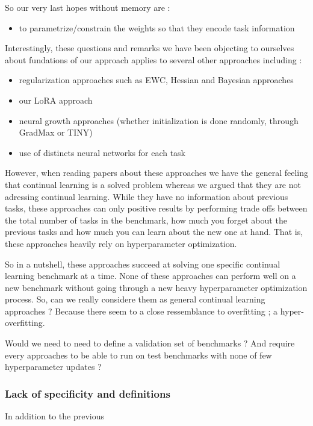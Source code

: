 \documentclass{article}
\begin{document}
So our very last hopes without memory are :
\begin{itemize}
    \item to parametrize/constrain the weights so that they encode task information
\end{itemize}

Interestingly, these questions and remarks we have been objecting to ourselves about fundations of our approach applies to several other approaches including :
\begin{itemize}
    \item regularization approaches such as EWC, Hessian and Bayesian approaches
    \item our LoRA approach
    \item neural growth approaches (whether initialization is done randomly, through GradMax or TINY)
    \item use of distincts neural networks for each task
\end{itemize}

However, when reading papers about these approaches we have the general feeling that continual learning is a solved problem whereas we argued that they are not adressing continual learning. While they have no information about previous tasks, these approaches can only positive results by performing trade offs between the total number of tasks in the benchmark, how much you forget about the previous tasks and how much you can learn about the new one at hand. That is, these approaches heavily rely on hyperparameter optimization.


So in a nutshell, these approaches succeed at solving one specific continual learning benchmark at a time. None of these approaches can perform well on a new benchmark without going through a new heavy hyperparameter optimization process. So, can we really considere them as general continual learning approaches ? Because there seem to a close ressemblance to overfitting ; a hyper-overfitting.

Would we need to need to define a validation set of benchmarks ? And require every approaches to be able to run on test benchmarks with none of few hyperparameter updates ?


\subsubsection{Lack of specificity and definitions}

In addition to the previous
\end{document}
